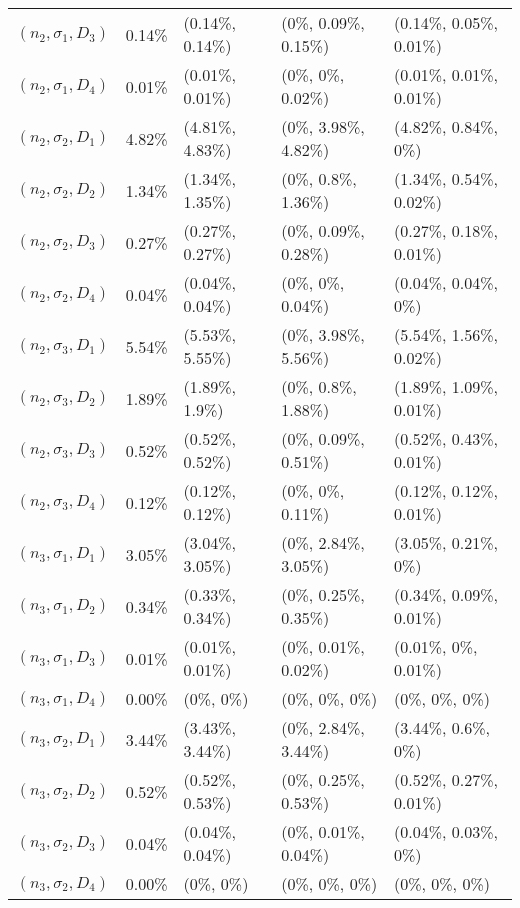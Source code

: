 \documentclass[preprint,12pt]{elsarticle}
\begin{document}
\begin{table}[htbp]
\begin{tabular}{lllll}
 $(n_{2},\sigma_{1},D_{3})$ & 0.14\% & (0.14\%, 0.14\%) & (0\%, 0.09\%, 0.15\%) & (0.14\%, 0.05\%, 0.01\%) \\
    $(n_{2},\sigma_{1},D_{4})$ & 0.01\% & (0.01\%, 0.01\%) & (0\%, 0\%, 0.02\%) & (0.01\%, 0.01\%, 0.01\%) \\
    $(n_{2},\sigma_{2},D_{1})$ & 4.82\% & (4.81\%, 4.83\%) & (0\%, 3.98\%, 4.82\%) & (4.82\%, 0.84\%, 0\%) \\
    $(n_{2},\sigma_{2},D_{2})$ & 1.34\% & (1.34\%, 1.35\%) & (0\%, 0.8\%, 1.36\%) & (1.34\%, 0.54\%, 0.02\%) \\
     $(n_{2},\sigma_{2},D_{3})$ & 0.27\% & (0.27\%, 0.27\%) & (0\%, 0.09\%, 0.28\%) & (0.27\%, 0.18\%, 0.01\%) \\
     $(n_{2},\sigma_{2},D_{4})$ & 0.04\% & (0.04\%, 0.04\%) & (0\%, 0\%, 0.04\%) & (0.04\%, 0.04\%, 0\%) \\
      $(n_{2},\sigma_{3},D_{1})$ & 5.54\% & (5.53\%, 5.55\%) & (0\%, 3.98\%, 5.56\%) & (5.54\%, 1.56\%, 0.02\%) \\
     $(n_{2},\sigma_{3},D_{2})$ & 1.89\% & (1.89\%, 1.9\%) & (0\%, 0.8\%, 1.88\%) & (1.89\%, 1.09\%, 0.01\%) \\
     $(n_{2},\sigma_{3},D_{3})$ & 0.52\% & (0.52\%, 0.52\%) & (0\%, 0.09\%, 0.51\%) & (0.52\%, 0.43\%, 0.01\%) \\
      $(n_{2},\sigma_{3},D_{4})$ & 0.12\% & (0.12\%, 0.12\%) & (0\%, 0\%, 0.11\%) & (0.12\%, 0.12\%, 0.01\%) \\
    $(n_{3},\sigma_{1},D_{1})$ & 3.05\% & (3.04\%, 3.05\%) & (0\%, 2.84\%, 3.05\%) & (3.05\%, 0.21\%, 0\%) \\
    $(n_{3},\sigma_{1},D_{2})$ & 0.34\% & (0.33\%, 0.34\%) & (0\%, 0.25\%, 0.35\%) & (0.34\%, 0.09\%, 0.01\%) \\
     $(n_{3},\sigma_{1},D_{3})$ & 0.01\% & (0.01\%, 0.01\%) & (0\%, 0.01\%, 0.02\%) & (0.01\%, 0\%, 0.01\%) \\
    $(n_{3},\sigma_{1},D_{4})$ & 0.00\% & (0\%, 0\%) & (0\%, 0\%, 0\%) & (0\%, 0\%, 0\%) \\
     $(n_{3},\sigma_{2},D_{1})$ & 3.44\% & (3.43\%, 3.44\%) & (0\%, 2.84\%, 3.44\%) & (3.44\%, 0.6\%, 0\%) \\
    $(n_{3},\sigma_{2},D_{2})$  & 0.52\% & (0.52\%, 0.53\%) & (0\%, 0.25\%, 0.53\%) & (0.52\%, 0.27\%, 0.01\%) \\
    $(n_{3},\sigma_{2},D_{3})$ & 0.04\% & (0.04\%, 0.04\%) & (0\%, 0.01\%, 0.04\%) & (0.04\%, 0.03\%, 0\%) \\
     $(n_{3},\sigma_{2},D_{4})$ & 0.00\% & (0\%, 0\%) & (0\%, 0\%, 0\%) & (0\%, 0\%, 0\%) \\

\end{tabular}
\end{table}
\end{document}
